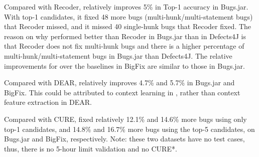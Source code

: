 Compared with Recoder, {\tool} relatively improves 5\% in Top-1
accuracy in Bugs.jar. With top-1 candidates, it fixed 48 more bugs
(multi-hunk/multi-statement bugs) that Recoder missed, and it missed
40 single-hunk bugs that Recoder fixed. The reason on why {\tool}
performed better than Recoder in Bugs.jar than in Defects4J is that
Recoder does not fix multi-hunk bugs and there is a higher percentage
of multi-hunk/multi-statement bugs in Bugs.jar than Defects4J. The
relative improvements for {\tool} over the baselines in BigFix are
similar to those in Bugs.jar.

Compared with DEAR, {\tool} relatively improves 4.7\% and
5.7\% in Bugs.jar and BigFix. This could be attributed to context
learning in {\tool}, rather than context feature extraction
in DEAR.

Compared with CURE, {\tool} fixed relatively 12.1\% and 14.6\% more
bugs using only top-1 candidates, and 14.8\% and 16.7\% more bugs using
the top-5 candidates,
on Bugs.jar and BigFix, respectively. Note: these two datasets have no
test cases, thus, there is no 5-hour limit validation and no CURE*.


